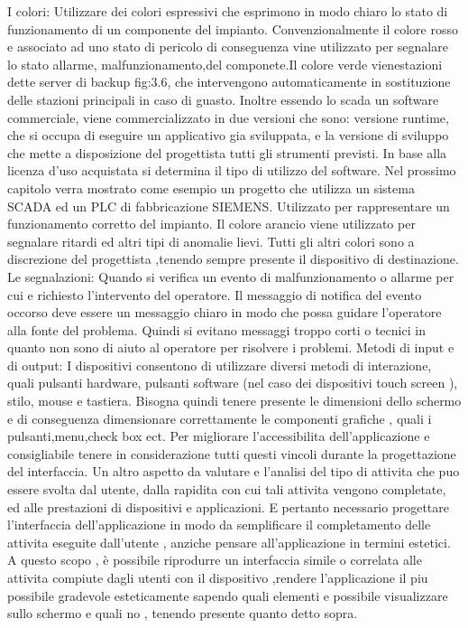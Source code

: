 \documentclass[12pt, a4paper, oneside]{book}
\begin{document}
I colori: Utilizzare dei colori espressivi che esprimono in modo chiaro lo stato di funzionamento di un componente del impianto. Convenzionalmente il colore rosso e associato ad uno stato di pericolo di conseguenza vine utilizzato per segnalare lo stato allarme, malfunzionamento,del componete.Il colore verde vienestazioni dette server di backup fig:3.6, che intervengono automaticamente in sostituzione delle stazioni principali in caso di guasto. Inoltre essendo lo scada un software commerciale, viene commercializzato in due versioni che sono: versione runtime, che si occupa di eseguire un applicativo gia sviluppata, e la versione di sviluppo che mette a disposizione del progettista tutti gli strumenti previsti. In base alla licenza d’uso acquistata si determina il tipo di utilizzo del software. Nel prossimo capitolo verra mostrato come esempio un progetto che utilizza un sistema SCADA ed un PLC di fabbricazione SIEMENS. Utilizzato per rappresentare un funzionamento corretto del impianto. Il colore arancio viene utilizzato per segnalare ritardi ed altri tipi di anomalie lievi. Tutti gli altri colori sono a discrezione del progettista ,tenendo sempre presente il dispositivo di destinazione. Le segnalazioni: Quando si verifica un evento di malfunzionamento o allarme per cui e richiesto l’intervento del operatore. Il messaggio di notifica del evento occorso deve essere un messaggio chiaro in modo che possa guidare l’operatore alla fonte del problema. Quindi si evitano messaggi troppo corti o tecnici in quanto non sono di aiuto al operatore per risolvere i problemi. Metodi di input e di output: I dispositivi consentono di utilizzare diversi metodi di interazione, quali pulsanti hardware, pulsanti software (nel caso dei dispositivi touch screen ), stilo, mouse e tastiera. Bisogna quindi tenere presente le dimensioni dello schermo e di conseguenza dimensionare correttamente le componenti grafiche , quali i pulsanti,menu,check box ect. Per migliorare l’accessibilita dell’applicazione e consigliabile tenere in considerazione tutti questi vincoli durante la progettazione del interfaccia. Un altro aspetto da valutare e l'analisi del tipo di attivita che puo essere svolta dal utente, dalla rapidita con cui tali attivita vengono completate, ed alle prestazioni di dispositivi e applicazioni. E pertanto necessario progettare l’interfaccia dell’applicazione in modo da semplificare il completamento delle attivita eseguite dall’utente , anziche pensare all’applicazione in termini estetici. A questo scopo , è possibile riprodurre un interfaccia simile o correlata alle attivita compiute dagli 
utenti con il dispositivo ,rendere l’applicazione il piu possibile gradevole esteticamente
sapendo quali elementi e possibile visualizzare sullo schermo e quali no
, tenendo presente quanto detto sopra.
\end{document}
